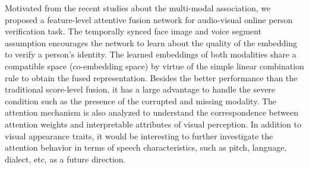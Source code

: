 \documentclass{article}
\begin{document}
Motivated from the recent studies about the multi-modal association, we proposed a feature-level attentive fusion network for audio-visual online person verification task. 
The temporally synced face image and voice segment assumption encourages the network to learn about the quality of the embedding to verify a person's identity. 
The learned embeddings of both modalities share a compatible space (co-embedding space) by virtue of the simple linear combination rule to obtain the fused representation. 
Besides the better performance than the traditional score-level fusion, it has a large advantage to handle the severe condition such as the presence of the corrupted and missing modality. 
The attention mechanism is also analyzed to understand the correspondence between attention weights and interpretable attributes of visual perception.
In addition to visual appearance traits, it would be interesting to further investigate the attention behavior in terms of speech characteristics, such as pitch, language, dialect, etc, as a future direction. 



\clearpage
\newpage


\small

\end{document}
